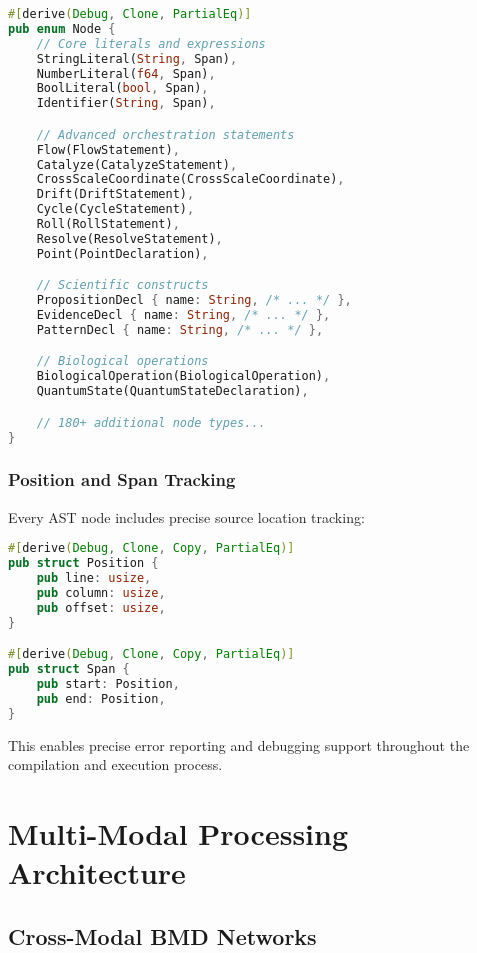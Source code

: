 \documentclass[12pt,a4paper,twoside]{article}
\begin{document}
\begin{itemize}
\begin{lstlisting}[language=rust,caption=AST Node Enumeration (Excerpt)]
#[derive(Debug, Clone, PartialEq)]
pub enum Node {
    // Core literals and expressions
    StringLiteral(String, Span),
    NumberLiteral(f64, Span),
    BoolLiteral(bool, Span),
    Identifier(String, Span),

    // Advanced orchestration statements
    Flow(FlowStatement),
    Catalyze(CatalyzeStatement),
    CrossScaleCoordinate(CrossScaleCoordinate),
    Drift(DriftStatement),
    Cycle(CycleStatement),
    Roll(RollStatement),
    Resolve(ResolveStatement),
    Point(PointDeclaration),

    // Scientific constructs
    PropositionDecl { name: String, /* ... */ },
    EvidenceDecl { name: String, /* ... */ },
    PatternDecl { name: String, /* ... */ },

    // Biological operations
    BiologicalOperation(BiologicalOperation),
    QuantumState(QuantumStateDeclaration),

    // 180+ additional node types...
}
\end{lstlisting}

\subsubsection{Position and Span Tracking}

Every AST node includes precise source location tracking:

\begin{lstlisting}[language=rust,caption=Position Tracking System]
#[derive(Debug, Clone, Copy, PartialEq)]
pub struct Position {
    pub line: usize,
    pub column: usize,
    pub offset: usize,
}

#[derive(Debug, Clone, Copy, PartialEq)]
pub struct Span {
    pub start: Position,
    pub end: Position,
}
\end{lstlisting}

This enables precise error reporting and debugging support throughout the compilation and execution process.

\section{Multi-Modal Processing Architecture}

\subsection{Cross-Modal BMD Networks}


\end{itemize}
\end{document}
